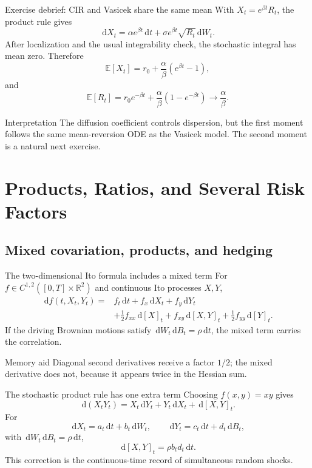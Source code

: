 \documentclass[handout,10pt,aspectratio=169]{beamer}
\newcommand{\E}{\mathbb E}
\newcommand{\R}{\mathbb R}
\newcommand{\dd}{\,\mathrm d}
\begin{document}
\begin{frame}{Exercise debrief: CIR and Vasicek share the same mean}
With \(X_t=e^{\beta t}R_t\), the product rule gives
\[
\dd X_t
=\alpha e^{\beta t}\dd t
+\sigma e^{\beta t}\sqrt{R_t}\dd W_t.
\]
After localization and the usual integrability check, the stochastic integral has mean zero. Therefore
\[
\E[X_t]=r_0+\frac{\alpha}{\beta}(e^{\beta t}-1),
\]
and
\[
\boxed{
\E[R_t]
=r_0e^{-\beta t}+\frac{\alpha}{\beta}(1-e^{-\beta t})
\longrightarrow\frac{\alpha}{\beta}.}
\]
\begin{block}{Interpretation}
The diffusion coefficient controls dispersion, but the first moment follows the same mean-reversion ODE as the Vasicek model. The second moment is a natural next exercise.
\end{block}
\end{frame}

\section{Products, Ratios, and Several Risk Factors}
\subsection{Mixed covariation, products, and hedging}

\begin{frame}{The two-dimensional Ito formula includes a mixed term}
For \(f\in C^{1,2}([0,T]\times\R^2)\) and continuous Ito processes \(X,Y\),
\[
\begin{aligned}
\dd f(t,X_t,Y_t)
={}&f_t\dd t+f_x\dd X_t+f_y\dd Y_t\\
&+\frac12f_{xx}\dd[X]_t
+f_{xy}\dd[X,Y]_t
+\frac12f_{yy}\dd[Y]_t.
\end{aligned}
\]
If the driving Brownian motions satisfy \(\dd W_t\dd B_t=\rho\dd t\), the mixed term carries the correlation.
\begin{block}{Memory aid}
Diagonal second derivatives receive a factor \(1/2\); the mixed derivative does not, because it appears twice in the Hessian sum.
\end{block}
\end{frame}

\begin{frame}{The stochastic product rule has one extra term}
Choosing \(f(x,y)=xy\) gives
\[
\boxed{\dd(X_tY_t)=X_t\dd Y_t+Y_t\dd X_t+\dd[X,Y]_t.}
\]
For
\[
\dd X_t=a_t\dd t+b_t\dd W_t,
\qquad
\dd Y_t=c_t\dd t+d_t\dd B_t,
\]
with \(\dd W_t\dd B_t=\rho\dd t\),
\[
\dd[X,Y]_t=\rho b_td_t\dd t.
\]
This correction is the continuous-time record of simultaneous random shocks.
\end{frame}
\end{document}
